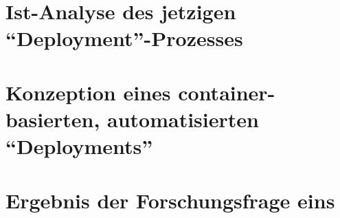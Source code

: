 
\section{Ist-Analyse des jetzigen \enquote{Deployment}-Prozesses}

\section{Konzeption eines container-basierten, automatisierten \enquote{Deployments}}

\section{Ergebnis der Forschungsfrage eins}
